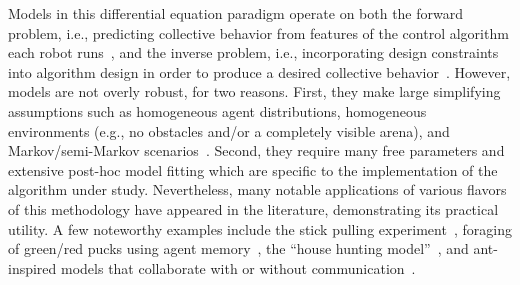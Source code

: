 Models in this differential equation paradigm operate on both the forward
problem, i.e., predicting collective behavior from features of the control
algorithm each robot runs~\cite{Lerman2002}, and the inverse problem, i.e.,
incorporating design constraints into algorithm design in order to produce a
desired collective behavior~\cite{Berman2007,Hsieh2008}. However, models are not
overly robust, for two reasons. First, they make large simplifying assumptions
such as homogeneous agent distributions, homogeneous environments (e.g., no
obstacles and/or a completely visible arena), and Markov/semi-Markov
scenarios~\cite{Berman2007}.  Second, they require many free parameters and
extensive post-hoc model fitting which are specific to the implementation of the
algorithm under study. Nevertheless, many notable applications of various
flavors of this methodology have appeared in the literature, demonstrating its
practical utility. A few noteworthy examples include the stick pulling
experiment~\cite{Ijspeert2001}, foraging of green/red pucks using agent
memory~\cite{Lerman2003a}, the ``house hunting
model''~\cite{Hsieh2008,Berman2007}, and ant-inspired models that collaborate
with or without communication~\cite{Sugawara1998,Sugawara1997}.

